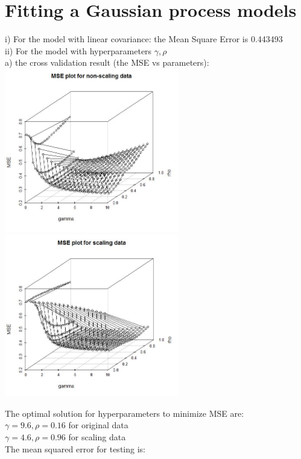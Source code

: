 \documentclass[12pt]{article}
\begin{document}
\section{Fitting a Gaussian process models }

i) For the model with linear covariance: the Mean Square Error is 0.443493 \\

ii) For the model with hyperparameters $\gamma, \rho $\\

a) the cross validation result (the MSE vs parameters):\\
\includegraphics[width=3in]{1}	
\includegraphics[width=3in]{2}

The optimal solution for hyperparameters to minimize MSE are:\\

 $\gamma = 9.6, \rho = 0.16 $ for original data\\
 $\gamma = 4.6, \rho = 0.96 $ for scaling data\\

The mean squared error for testing is:\\
\end{document}
